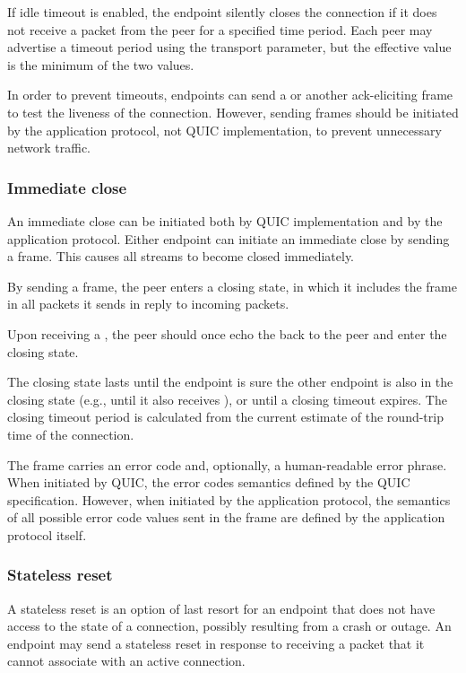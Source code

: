 If idle timeout is enabled, the endpoint silently closes the connection if it does not receive a
packet from the peer for a specified time period. Each peer may advertise a timeout period using the
\MaxIdleTimeout{} transport parameter, but the effective value is the minimum of the two
values.

In order to prevent timeouts, endpoints can send a \PING{} or another ack-eliciting frame to test
the liveness of the connection. However, sending \PING{} frames should be initiated by the
application protocol, not QUIC implementation, to prevent unnecessary network traffic.

\subsubsection{Immediate close}

An immediate close can be initiated both by QUIC implementation and by the application protocol.
Either endpoint can initiate an immediate close by sending a \CONNECTIONCLOSE{} frame. This causes
all streams to become closed immediately.

By sending a \CONNECTIONCLOSE{} frame, the peer enters a closing state, in which it includes the
\CONNECTIONCLOSE{} frame in all packets it sends in reply to incoming packets.

Upon receiving a \CONNECTIONCLOSE{}, the peer should once echo the \CONNECTIONCLOSE{} back to the
peer and enter the closing state.

The closing state lasts until the endpoint is sure the other endpoint is also in the closing state
(e.g., until it also receives \CONNECTIONCLOSE{}), or until a closing timeout expires. The closing
timeout period is calculated from the current estimate of the round-trip time of the connection.

The \CONNECTIONCLOSE{} frame carries an error code and, optionally, a human-readable error phrase.
When initiated by QUIC, the error codes semantics defined by the QUIC specification. However, when
initiated by the application protocol, the semantics of all possible error code values sent in the
frame are defined by the application protocol itself.

\subsubsection{Stateless reset}

A stateless reset is an option of last resort for an endpoint that does not have access to the state
of a connection, possibly resulting from a crash or outage. An endpoint may send a stateless reset
in response to receiving a packet that it cannot associate with an active connection.

